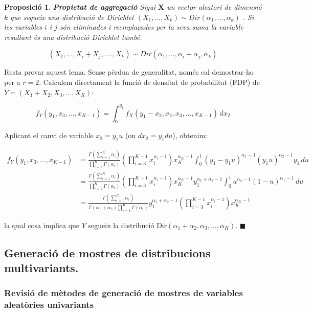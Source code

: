 \documentclass[
  catalan,
]{article}
\newtheorem{proposition}{Proposició}[section]
\theoremstyle{definition}
\theoremstyle{definition}
\theoremstyle{definition}
\theoremstyle{definition}
\theoremstyle{remark}
\begin{document}
\begin{proposition}
\textbf{Propietat de aggregació}
Sigui \(\mathbf{X}\) un vector aleatori de dimensió \(k\) que segueix una distribució de Dirichlet \((X_1,...,X_k) \sim  Dir(\alpha_1,...,\alpha_k)\) . Si les variables \(i\) i \(j\) són eliminades i reemplaçades per la seva suma la variable resultant és una distribució Dirichlet també.

\[
(X_1,...,X_i+X_j,....,X_k) \sim  Dir(\alpha_1,...,\alpha_i+\alpha_j,\alpha_k)
\]
\end{proposition}

Resta provar aquest lema. Sense pèrdua de generalitat, només cal demostrar-ho per a \(r=2\). Calculem directament la funció de densitat de probabilitat (FDP) de \(Y = (X_1 + X_2, X_3, \dots, X_K)\):

\[f_{Y}(y_1, x_3, \dots, x_{K-1}) = \int_{0}^{y_1} f_{X}(y_1 - x_2, x_2, x_3, \dots, x_{K-1}) \, dx_2\]

Aplicant el canvi de variable \(x_2 = y_1 u\) (on \(dx_2 = y_1 du\)), obtenim:

\[\begin{aligned}
f_{Y}(y_1, x_3, \dots, x_{K-1}) &= \frac{\Gamma(\sum_{i=1}^K \alpha_i)}{\prod_{i=1}^K \Gamma(\alpha_i)} \left( \prod_{i=3}^{K-1} x_i^{\alpha_i - 1} \right) x_K^{\alpha_K - 1} \int_{0}^{1} (y_1 - y_1 u)^{\alpha_1 - 1} (y_1 u)^{\alpha_2 - 1} y_1 \, du \\
&= \frac{\Gamma(\sum_{i=1}^K \alpha_i)}{\prod_{i=1}^K \Gamma(\alpha_i)} \left( \prod_{i=3}^{K-1} x_i^{\alpha_i - 1} \right) x_K^{\alpha_K - 1} y_1^{\alpha_1 + \alpha_2 - 1} \int_{0}^{1} u^{\alpha_2 - 1} (1 - u)^{\alpha_1 - 1} \, du \\
&= \frac{\Gamma(\sum_{i=1}^K \alpha_i)}{\Gamma(\alpha_1 + \alpha_2) \prod_{i=3}^K \Gamma(\alpha_i)} y_1^{\alpha_1 + \alpha_2 - 1} \left( \prod_{i=3}^{K-1} x_i^{\alpha_i - 1} \right) x_K^{\alpha_K - 1}
\end{aligned}\]

la qual cosa implica que \(Y\) segueix la distribució \(\text{Dir}(\alpha_1 + \alpha_2, \alpha_3, \dots, \alpha_K)\). \(\blacksquare\)

\subsection{Generació de mostres de distribucions multivariants.}\label{generaciuxf3-de-mostres-de-distribucions-multivariants.}

\subsubsection{Revisió de mètodes de generació de mostres de variables aleatòries univariants}\label{revisiuxf3-de-muxe8todes-de-generaciuxf3-de-mostres-de-variables-aleatuxf2ries-univariants}
\end{document}
